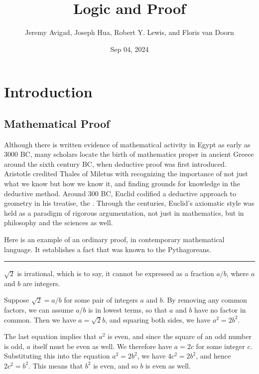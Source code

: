 \documentclass[letterpaper,10pt,english]{sphinxmanual}
\title{Logic and Proof}
\date{Sep 04, 2024}
\author{Jeremy Avigad, Joseph Hua, Robert Y. Lewis, and Floris van Doorn}
\begin{document}
\pagestyle{empty}
\sphinxmaketitle
\pagestyle{plain}
\sphinxtableofcontents
\pagestyle{normal}
\label{\detokenize{index::doc}}



\chapter{Introduction}
\label{\detokenize{introduction:introduction}}\label{\detokenize{introduction:id1}}\label{\detokenize{introduction::doc}}

\section{Mathematical Proof}
\label{\detokenize{introduction:mathematical-proof}}
\sphinxAtStartPar
Although there is written evidence of mathematical activity in Egypt as early as 3000 BC, many scholars locate the birth of mathematics proper in ancient Greece around the sixth century BC, when deductive proof was first introduced. Aristotle credited Thales of Miletus with recognizing the importance of not just what we know but how we know it, and finding grounds for knowledge in the deductive method. Around 300 BC, Euclid codified a deductive approach to geometry in his treatise, the . Through the centuries, Euclid’s axiomatic style was held as a paradigm of rigorous argumentation, not just in mathematics, but in philosophy and the sciences as well.

\sphinxAtStartPar
Here is an example of an ordinary proof, in contemporary mathematical language. It establishes a fact that was known to the Pythagoreans.


\bigskip\hrule\bigskip


\sphinxAtStartPar
{} \(\sqrt 2\) is irrational, which is to say, it cannot be expressed as a fraction \(a / b\), where \(a\) and \(b\) are integers.

\sphinxAtStartPar
{} Suppose \(\sqrt 2 = a / b\) for some pair of integers \(a\) and \(b\). By removing any common factors, we can assume \(a / b\) is in lowest terms, so that \(a\) and \(b\) have no factor in common. Then we have \(a = \sqrt 2 b\), and squaring both sides, we have \(a^2 = 2 b^2\).

\sphinxAtStartPar
The last equation implies that \(a^2\) is even, and since the square of an odd number is odd, \(a\) itself must be even as well. We therefore have \(a = 2c\) for some integer \(c\). Substituting this into the equation \(a^2 = 2 b^2\), we have \(4 c^2 = 2 b^2\), and hence \(2 c^2 = b^2\). This means that \(b^2\) is even, and so \(b\) is even as well.
\end{document}
